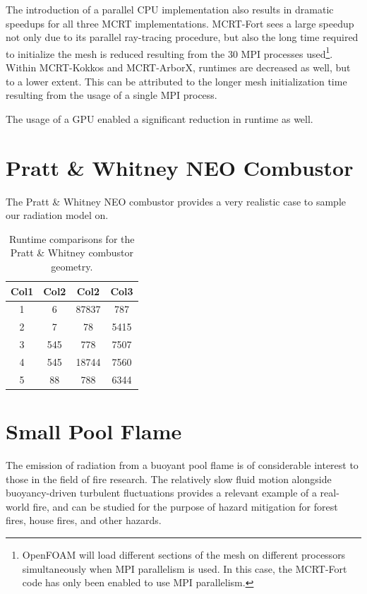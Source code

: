 The introduction of a parallel CPU implementation also results in dramatic speedups for all three MCRT implementations. MCRT-Fort sees a large speedup not only due to its parallel ray-tracing procedure, but also the long time required to initialize the mesh is reduced resulting from the 30 MPI processes used\footnote{OpenFOAM will load different sections of the mesh on different processors simultaneously when MPI parallelism is used. In this case, the MCRT-Fort code has only been enabled to use MPI parallelism.}.
Within MCRT-Kokkos and MCRT-ArborX, runtimes are decreased as well, but to a lower extent. This can be attributed to the longer mesh initialization time resulting from the usage of a single MPI process.

The usage of a GPU enabled a significant reduction in runtime as well. 



\section{Pratt \& Whitney NEO Combustor}
The Pratt \& Whitney NEO combustor provides a very realistic case to sample our radiation model on.

\begin{table}[h!]
\centering
\begin{tabular}{||c c c c||} 
 \hline
 Col1 & Col2 & Col2 & Col3 \\ [0.5ex] 
 \hline\hline
 1 & 6 & 87837 & 787 \\ 
 2 & 7 & 78 & 5415 \\
 3 & 545 & 778 & 7507 \\
 4 & 545 & 18744 & 7560 \\
 5 & 88 & 788 & 6344 \\ [1ex] 
 \hline
\end{tabular}
\caption{Runtime comparisons for the Pratt \& Whitney combustor geometry.}
\label{table:PW_runtime_table}
\end{table}


\section{Small Pool Flame}
The emission of radiation from a buoyant pool flame is of considerable interest to those in the field of fire research. 
The relatively slow fluid motion alongside buoyancy-driven turbulent fluctuations provides a relevant example of a real-world fire, and can be studied for the purpose of hazard mitigation for forest fires, house fires, and other hazards.

